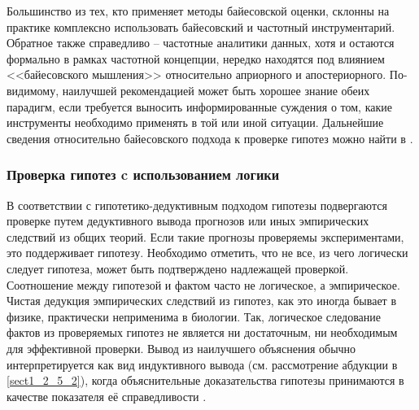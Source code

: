 Большинство из тех, кто применяет методы байесовской оценки, склонны на практике комплексно использовать байесовский 
и частотный инструментарий. Обратное также справедливо – частотные аналитики данных, хотя и остаются формально в 
рамках частотной концепции, нередко находятся под влиянием <<байесовского мышления>> относительно априорного и 
апостериорного. По-видимому, наилучшей рекомендацией может быть хорошее знание обеих парадигм, если требуется 
выносить информированные суждения о том, какие инструменты необходимо применять в той или иной ситуации. Дальнейшие 
сведения относительно байесовского подхода к проверке гипотез можно найти в \cite{ivezic2019statistics, sivia2006data, 
rouder2009bayesian}.

\subsubsection{Проверка гипотез c использованием логики}\label{sect1_2_2_3}
В соответствии с гипотетико-дедуктивным подходом гипотезы подвергаются проверке путем дедуктивного вывода прогнозов или 
иных эмпирических следствий из общих теорий. Если такие прогнозы проверяемы экспериментами, это поддерживает гипотезу. 
Необходимо отметить, что не все, из чего логически следует гипотеза, может быть подтверждено надлежащей проверкой. 
Соотношение между гипотезой и фактом часто не логическое, а эмпирическое. Чистая дедукция эмпирических следствий из 
гипотез, как это иногда бывает в физике, практически неприменима в биологии. Так, логическое следование фактов из 
проверяемых гипотез не является ни достаточным, ни необходимым для эффективной проверки. Вывод из наилучшего объяснения 
обычно интерпретируется как вид индуктивного вывода (см. рассмотрение абдукции в \ref{sect1_2_5_2}), когда 
объяснительные доказательства гипотезы принимаются в качестве показателя её справедливости \cite{weber2014}. 

